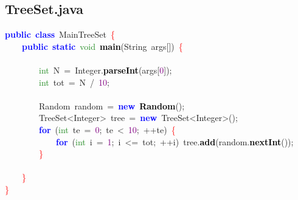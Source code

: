 \subsection{TreeSet.java}
\noindent
\mbox{}\textbf{\textcolor{Blue}{public}}\ \textbf{\textcolor{Blue}{class}}\ \textcolor{TealBlue}{MainTreeSet}\ \textcolor{Red}{\{} \\
\mbox{}\ \ \ \ \textbf{\textcolor{Blue}{public}}\ \textbf{\textcolor{Blue}{static}}\ \textcolor{ForestGreen}{void}\ \textbf{\textcolor{Black}{main}}\textcolor{BrickRed}{(}\textcolor{TealBlue}{String}\ args\textcolor{BrickRed}{[])}\ \textcolor{Red}{\{} \\
\mbox{}\ \ \ \ \ \ \ \  \\
\mbox{}\ \ \ \ \ \ \ \ \textcolor{ForestGreen}{int}\ N\ \textcolor{BrickRed}{=}\ Integer\textcolor{BrickRed}{.}\textbf{\textcolor{Black}{parseInt}}\textcolor{BrickRed}{(}args\textcolor{BrickRed}{[}\textcolor{Purple}{0}\textcolor{BrickRed}{]);} \\
\mbox{}\ \ \ \ \ \ \ \ \textcolor{ForestGreen}{int}\ tot\ \textcolor{BrickRed}{=}\ N\ \textcolor{BrickRed}{/}\ \textcolor{Purple}{10}\textcolor{BrickRed}{;} \\
\mbox{} \\
\mbox{}\ \ \ \ \ \ \ \ \textcolor{TealBlue}{Random}\ random\ \textcolor{BrickRed}{=}\ \textbf{\textcolor{Blue}{new}}\ \textbf{\textcolor{Black}{Random}}\textcolor{BrickRed}{();} \\
\mbox{}\ \ \ \ \ \ \ \ \textcolor{TealBlue}{TreeSet\textless{}Integer\textgreater{}}\ tree\ \textcolor{BrickRed}{=}\ \textbf{\textcolor{Blue}{new}}\ TreeSet\textcolor{BrickRed}{\textless{}}Integer\textcolor{BrickRed}{\textgreater{}();} \\
\mbox{}\ \ \ \ \ \ \ \ \textbf{\textcolor{Blue}{for}}\ \textcolor{BrickRed}{(}\textcolor{ForestGreen}{int}\ te\ \textcolor{BrickRed}{=}\ \textcolor{Purple}{0}\textcolor{BrickRed}{;}\ te\ \textcolor{BrickRed}{\textless{}}\ \textcolor{Purple}{10}\textcolor{BrickRed}{;}\ \textcolor{BrickRed}{++}te\textcolor{BrickRed}{)}\ \textcolor{Red}{\{} \\
\mbox{}\ \ \ \ \ \ \ \ \ \ \ \ \textbf{\textcolor{Blue}{for}}\ \textcolor{BrickRed}{(}\textcolor{ForestGreen}{int}\ i\ \textcolor{BrickRed}{=}\ \textcolor{Purple}{1}\textcolor{BrickRed}{;}\ i\ \textcolor{BrickRed}{\textless{}=}\ tot\textcolor{BrickRed}{;}\ \textcolor{BrickRed}{++}i\textcolor{BrickRed}{)}\ tree\textcolor{BrickRed}{.}\textbf{\textcolor{Black}{add}}\textcolor{BrickRed}{(}random\textcolor{BrickRed}{.}\textbf{\textcolor{Black}{nextInt}}\textcolor{BrickRed}{());} \\
\mbox{}\ \ \ \ \ \ \ \ \textcolor{Red}{\}} \\
\mbox{} \\
\mbox{}\ \ \ \ \textcolor{Red}{\}} \\
\mbox{}\textcolor{Red}{\}} \\
\mbox{}

